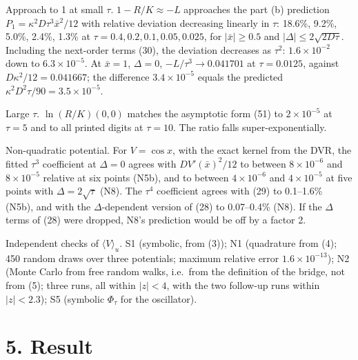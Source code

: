 \documentclass[11pt,a4paper]{article}
\begin{document}
Approach to 1 at small \(\tau\). \(1-R/K\approx-L\) approaches the part (b) prediction \(P_1=\kappa^2D\tau^3\bar x^2/12\) with relative deviation decreasing linearly in \(\tau\): 18.6\%, 9.2\%, 5.0\%, 2.4\%, 1.3\% at \(\tau=0.4,0.2,0.1,0.05,0.025\), for \(|\bar x|\ge0.5\) and \(|\Delta|\le2\sqrt{2D\tau}\). Including the next-order terms (30), the deviation decreases as \(\tau^2\): \(1.6\times10^{-2}\) down to \(6.3\times10^{-5}\). At \(\bar x=1\), \(\Delta=0\), \(-L/\tau^3\to0.041701\) at \(\tau=0.0125\), against \(D\kappa^2/12=0.041667\); the difference \(3.4\times10^{-5}\) equals the predicted \(\kappa^2D^2\tau/90=3.5\times10^{-5}\).

Large \(\tau\). \(\ln(R/K)(0,0)\) matches the asymptotic form (51) to \(2\times10^{-5}\) at \(\tau=5\) and to all printed digits at \(\tau=10\). The ratio falls super-exponentially.

Non-quadratic potential. For \(V=\cos x\), with the exact kernel from the DVR, the fitted \(\tau^3\) coefficient at \(\Delta=0\) agrees with \(DV'(\bar x)^2/12\) to between \(8\times10^{-6}\) and \(8\times10^{-5}\) relative at six points (N5b), and to between \(4\times10^{-6}\) and \(4\times10^{-5}\) at five points with \(\Delta=2\sqrt\tau\) (N8). The \(\tau^4\) coefficient agrees with (29) to 0.1--1.6\% (N5b), and with the \(\Delta\)-dependent version of (28) to 0.07--0.4\% (N8). If the \(\Delta\) terms of (28) were dropped, N8's prediction would be off by a factor 2.

Independent checks of \(\langle V\rangle_u\). S1 (symbolic, from (3)); N1 (quadrature from (4); 450 random draws over three potentials; maximum relative error \(1.6\times10^{-13}\)); N2 (Monte Carlo from free random walks, i.e.~from the definition of the bridge, not from (5); three runs, all within \(|z|<4\), with the two follow-up runs within \(|z|<2.3\)); S5 (symbolic \(\Phi_\tau\) for the oscillator).

\hypertarget{result}{%
\section{5. Result}\label{result}}
\end{document}
